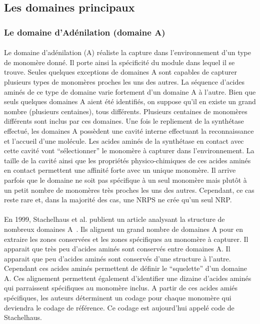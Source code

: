 \documentclass[12pt,french,twoside]{report}
\begin{document}
\subsection{Les domaines principaux}

\subsubsection{Le domaine d'Adénilation (domaine A)}

\paragraph{}Le domaine d'adénilation (A) réaliste la capture dans l'environnement d'un type de monomère donné.
Il porte ainsi la spécificité du module dans lequel il se trouve.
Seules quelques exceptions de domaines A sont capables de capturer plusieurs types de monomères proches les uns des autres.
La séquence d'acides aminés de ce type de domaine varie fortement d'un domaine A à l'autre.
Bien que seuls quelques domaines A aient été identifiés, on suppose qu'il en existe un grand nombre (plusieurs centaines), tous différents.
Plusieurs centaines de monomères différents sont inclus par ces domaines.
Une fois le repliement de la synthétase effectué, les domaines A possèdent une cavité interne effectuant la reconnaissance et l'accueil d'une molécule.
Les acides aminés de la synthétase en contact avec cette cavité vont ``sélectionner'' le monomère à capturer dans l'environnement.
La taille de la cavité ainsi que les propriétés physico-chimiques de ces acides aminés en contact permettent une affinité forte avec un unique monomère.
Il arrive parfois que le domaine ne soit pas spécifique à un seul monomère mais plutôt à un petit nombre de monomères très proches les uns des autres.
Cependant, ce cas reste rare et, dans la majorité des cas, une NRPS ne crée qu'un seul NRP.

\paragraph{}En 1999, Stachelhaus et al. publient un article analysant la structure de nombreux domaines A~\cite{stachelhaus_specificity-conferring_1999}.
Ils alignent un grand nombre de domaines A pour en extraire les zones conservées et les zones spécifiques au monomère à capturer.
Il apparait que très peu d'acides aminés sont conservés entre domaines A.
Il apparait que peu d'acides aminés sont conservés d'une structure à l'autre.
Cependant ces acides aminés permettent de définir le ``squelette'' d'un domaine A.
Ces alignement permettent également d'identifier une dizaine d'acides aminés qui parraissent spécifiques au monomère inclus.
A partir de ces acides amiés spécifiques, les auteurs déterminent un codage pour chaque monomère qui deviendra le codage de référence.
Ce codage est aujourd'hui appelé code de Stachelhaus.
\end{document}
